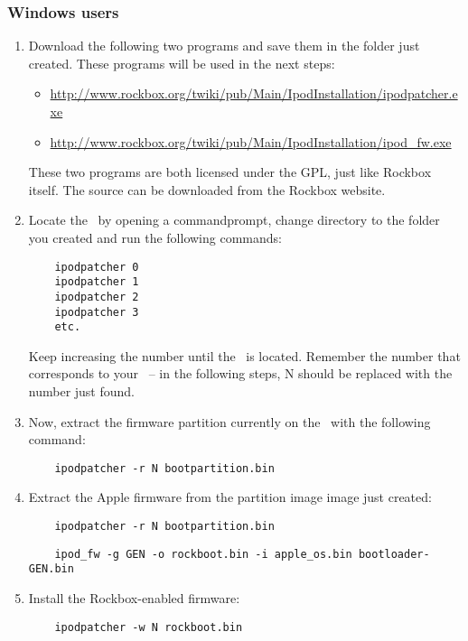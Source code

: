 \subsubsection{Windows users}
\begin{enumerate}
  \item Download the following two programs and save them in the folder just
    created. These programs will be used in the next steps:
    \begin{itemize}
      \item \url{http://www.rockbox.org/twiki/pub/Main/IpodInstallation/ipodpatcher.exe}
      \item \url{http://www.rockbox.org/twiki/pub/Main/IpodInstallation/ipod_fw.exe}
    \end{itemize}
    These two programs are both licensed under the GPL, just like Rockbox
    itself. The source can be downloaded from the Rockbox website.
  \item Locate the \dap\ by opening a commandprompt, change directory to the
    folder you created and run the following commands:
    \begin{verbatim}
    ipodpatcher 0
    ipodpatcher 1
    ipodpatcher 2
    ipodpatcher 3
    etc.
    \end{verbatim}
    Keep increasing the number until the \dap\ is located.  Remember the number that corresponds to your \dap\ -- in the 
    following steps, N should be replaced with the number just found.
  \item Now, extract the firmware partition currently on the \dap\  with the
    following command:
    \begin{verbatim}
    ipodpatcher -r N bootpartition.bin
    \end{verbatim}
  \item Extract the Apple firmware from the partition image image just created:
    \begin{verbatim}
    ipodpatcher -r N bootpartition.bin
    \end{verbatim}

    \begin{verbatim}
    ipod_fw -g GEN -o rockboot.bin -i apple_os.bin bootloader-GEN.bin
    \end{verbatim}
  \item
    Install the Rockbox-enabled firmware:
    \begin{verbatim}
    ipodpatcher -w N rockboot.bin
    \end{verbatim}
\end{enumerate}

